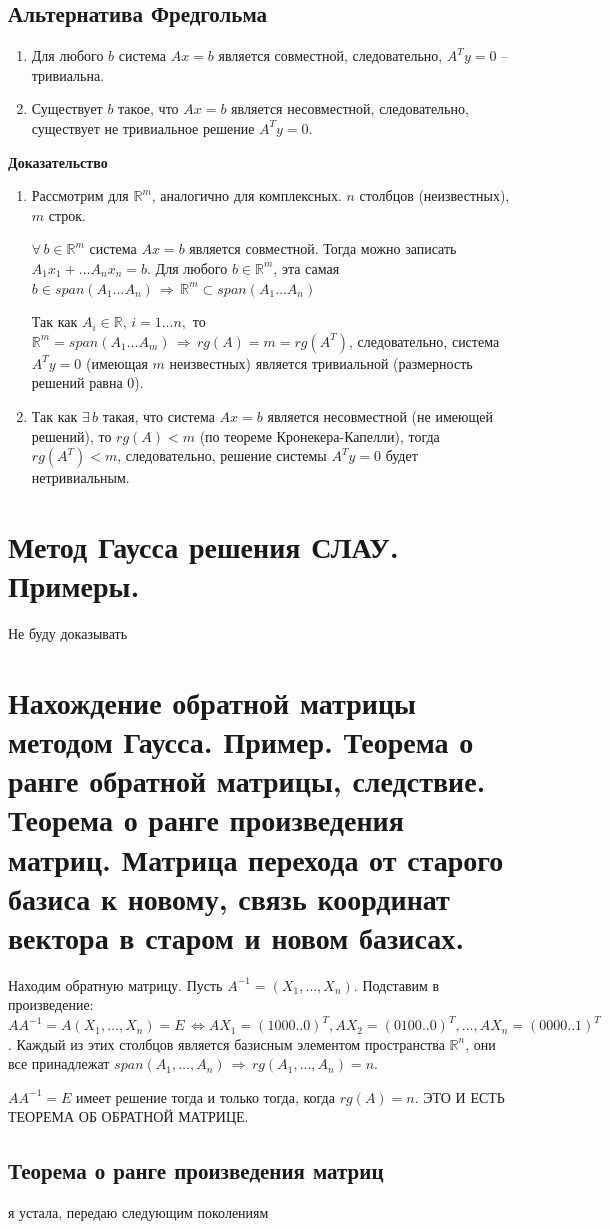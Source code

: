 \documentclass{article}
\newcommand{\R}{\mathbb R}
\begin{document}
\subsection{Альтернатива Фредгольма}
\begin{enumerate}
    \item Для любого $b$ система $Ax=b$ является совместной, следовательно, $A^T y=0$ -- тривиальна.
    \item Существует $b$ такое, что $Ax=b$ является несовместной, следовательно, существует не тривиальное решение $A^T y=0$.
    
\end{enumerate}
\textbf{Доказательство}
\begin{enumerate}
    \item Рассмотрим для $\R^m$, аналогично для комплексных. $n$ столбцов (неизвестных), $m$ строк.
    
    $\forall\,b\in\R^m$ система $Ax=b$ является совместной. Тогда можно записать $A_1x_1+\ldots A_n x_n=b$. Для любого $b\in\R^m$, эта самая $b\in span(A_1\ldots A_n)\,\Rightarrow\,\R^m\subset span(A_1\ldots A_n)$
    
    Так как $A_i\in\R,\,i=1\ldots n,$ то $\R^m=span(A_1\ldots A_m)\,\Rightarrow\,rg(A)=m=rg(A^T)$, следовательно, система $A^Ty=0$ (имеющая $m$ неизвестных) является тривиальной (размерность решений равна $0$).
    
    \item Так как $\exists\, b$ такая, что система $Ax=b$ является несовместной (не имеющей решений), то $rg(A)<m$ (по теореме Кронекера-Капелли), тогда $rg(A^T)<m$, следовательно, решение системы $A^T y=0$ будет нетривиальным.
\end{enumerate}

\newpage
\section{Метод Гаусса решения СЛАУ. Примеры.}
Не буду доказывать

\newpage
\section{Нахождение обратной матрицы методом Гаусса. Пример. Теорема о ранге обратной матрицы, следствие. Теорема о ранге произведения матриц. Матрица перехода от старого базиса к новому, связь координат вектора в старом и новом базисах.}
Находим обратную матрицу.
Пусть $A^{-1} = (X_1,\ldots,X_n)$. Подставим в произведение: $AA^{-1} = A(X_1,\ldots,X_n) = E\,\Leftrightarrow AX_1 =
(1000..0)^T , AX_2 = (0100..0)^T ,\ldots, AX_n = (0000..1)^T$. Каждый из этих столбцов является базисным элементом пространства $\R^n$, они все принадлежат $span(A_1,\ldots, A_n)\,\Rightarrow\, rg(A_1, \ldots,A_n) = n$.

$AA^{-1} = E$ имеет решение тогда и только тогда, когда $rg(A) = n$. ЭТО И ЕСТЬ ТЕОРЕМА ОБ ОБРАТНОЙ МАТРИЦЕ.

\subsection{Теорема о ранге произведения матриц}
я устала, передаю следующим поколениям
\end{document}

